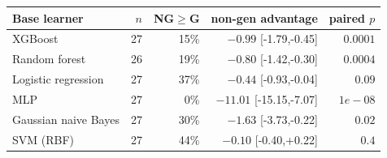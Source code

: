 \begin{tabular}{lrrrr}
\toprule
Base learner & $n$ & NG$\ge$G & non-gen advantage & paired $p$ \\
\midrule
XGBoost & 27 & 15\% & $-0.99$ [-1.79,-0.45] & $0.0001$ \\
Random forest & 26 & 19\% & $-0.80$ [-1.42,-0.30] & $0.0004$ \\
Logistic regression & 27 & 37\% & $-0.44$ [-0.93,-0.04] & $0.09$ \\
MLP & 27 & 0\% & $-11.01$ [-15.15,-7.07] & $1e-08$ \\
Gaussian naive Bayes & 27 & 30\% & $-1.63$ [-3.73,-0.22] & $0.02$ \\
SVM (RBF) & 27 & 44\% & $-0.10$ [-0.40,+0.22] & $0.4$ \\
\bottomrule
\end{tabular}
